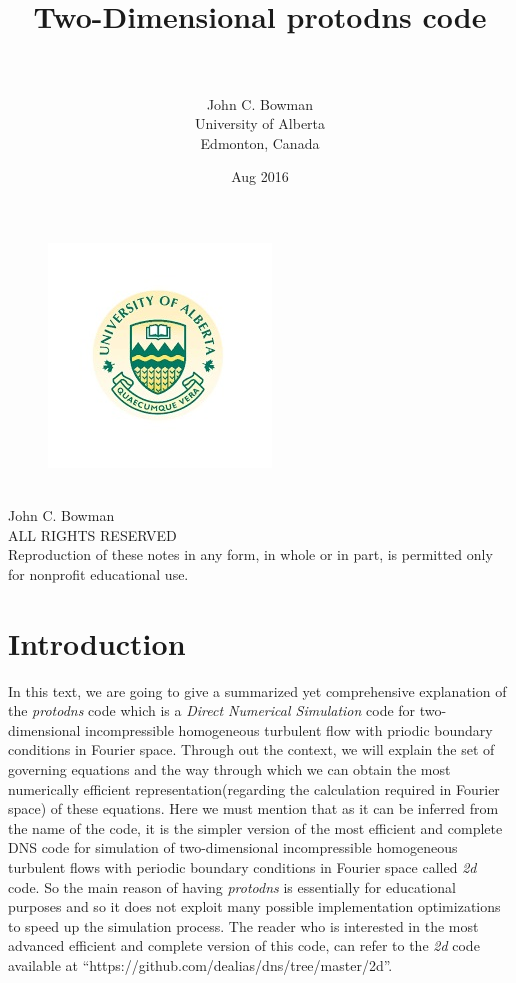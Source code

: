 \documentclass[12pt]{article}
\title{\huge{\textbf{\\Two-Dimensional protodns code}}}
\author{\\ \\John C. Bowman\\University of Alberta\\Edmonton, Canada}
\date{Aug 2016}
\begin{document}
\maketitle
\thispagestyle{empty}
\begin{figure}[h]
\centering
\includegraphics{Logo}
\end{figure}
\newpage
\thispagestyle{empty}
\begin{center}
\ \vspace{20cm}\\
John C. Bowman\\
ALL RIGHTS RESERVED\\
Reproduction of these notes in any form, in whole or in part, is permitted only for nonprofit educational use.
\end{center}
\newpage
\setcounter{page}{1}
\section{Introduction}
In this text, we are going to give a summarized yet comprehensive explanation of the \emph{protodns} code which is a \emph{Direct Numerical Simulation} code for two-dimensional incompressible homogeneous turbulent flow with priodic boundary conditions in Fourier space. Through out the context, we will explain the set of governing equations and the way through which we can obtain the most numerically efficient representation(regarding the calculation required in Fourier space) of these equations. 
Here we must mention that as it can be inferred from the name of the code, it is the simpler version of the most efficient and complete DNS code for simulation of two-dimensional incompressible homogeneous turbulent flows with periodic boundary conditions in Fourier space called \emph{2d} code. So the main reason of having \emph{protodns} is essentially for educational purposes and so it does not exploit many possible implementation optimizations to speed up the simulation process. The reader who is interested in the most advanced efficient and complete version of this code, can refer to the \emph{2d} code available at ``https://github.com/dealias/dns/tree/master/2d''.
%
\end{document}
